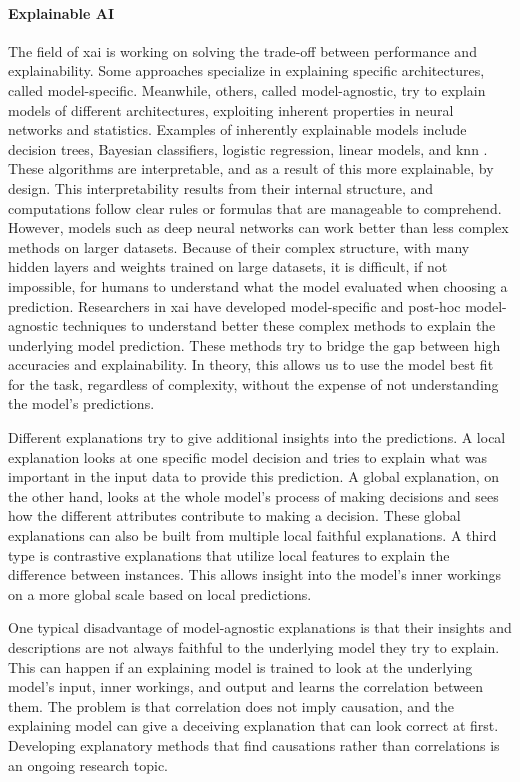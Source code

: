 \paragraph{Explainable AI\\}
The field of \gls{xai} is working on solving the trade-off between performance and explainability. Some approaches specialize in explaining specific architectures, called model-specific. Meanwhile, others, called model-agnostic, try to explain models of different architectures, exploiting inherent properties in neural networks and statistics. Examples of inherently explainable models include decision trees, Bayesian classifiers, logistic regression, linear models, and \gls{knn} \cite{fixDiscriminatoryAnalysisNonparametric1989, coverNearestNeighborPattern1967, molnarInterpretableMachineLearning}. These algorithms are interpretable, and as a result of this more explainable, by design. This interpretability results from their internal structure, and computations follow clear rules or formulas that are manageable to comprehend.
However, models such as deep neural networks can work better than less complex methods on larger datasets. Because of their complex structure, with many hidden layers and weights trained on large datasets, it is difficult, if not impossible, for humans to understand what the model evaluated when choosing a prediction. Researchers in \gls{xai} have developed model-specific and post-hoc model-agnostic techniques to understand better these complex methods to explain the underlying model prediction. These methods try to bridge the gap between high accuracies and explainability.
In theory, this allows us to use the model best fit for the task, regardless of complexity, without the expense of not understanding the model's predictions. 

Different explanations try to give additional insights into the predictions. A local explanation looks at one specific model decision and tries to explain what was important in the input data to provide this prediction. A global explanation, on the other hand, looks at the whole model's process of making decisions and sees how the different attributes contribute to making a decision. These global explanations can also be built from multiple local faithful explanations. A third type is contrastive explanations that utilize local features to explain the difference between instances. This allows insight into the model's inner workings on a more global scale based on local predictions.

One typical disadvantage of model-agnostic explanations is that their insights and descriptions are not always faithful to the underlying model they try to explain. This can happen if an explaining model is trained to look at the underlying model's input, inner workings, and output and learns the correlation between them. The problem is that correlation does not imply causation, and the explaining model can give a deceiving explanation that can look correct at first. Developing explanatory methods that find causations rather than correlations is an ongoing research topic.




